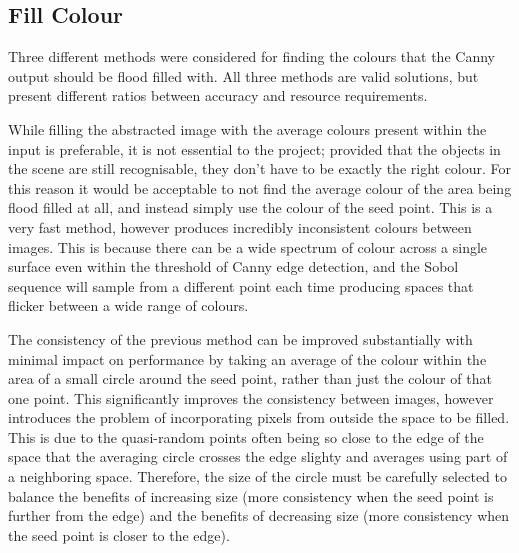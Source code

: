 \subsection{Fill Colour}

Three different methods were considered for finding the colours that the Canny output should be flood filled with. All three methods are valid solutions, but present different ratios between accuracy and resource requirements.

While filling the abstracted image with the average colours present within the input is preferable, it is not essential to the project; provided that the objects in the scene are still recognisable, they don't have to be exactly the right colour. For this reason it would be acceptable to not find the average colour of the area being flood filled at all, and instead simply use the colour of the seed point. This is a very fast method, however produces incredibly inconsistent colours between images. This is because there can be a wide spectrum of colour across a single surface even within the threshold of Canny edge detection, and the Sobol sequence will sample from a different point each time producing spaces that flicker between a wide range of colours.

The consistency of the previous method can be improved substantially with minimal impact on performance by taking an average of the colour within the area of a small circle around the seed point, rather than just the colour of that one point. This significantly improves the consistency between images, however introduces the problem of incorporating pixels from outside the space to be filled. This is due to the quasi-random points often being so close to the edge of the space that the averaging circle crosses the edge slighty and averages using part of a neighboring space. Therefore, the size of the circle must be carefully selected to balance the benefits of increasing size (more consistency when the seed point is further from the edge) and the benefits of decreasing size (more consistency when the seed point is closer to the edge). 

